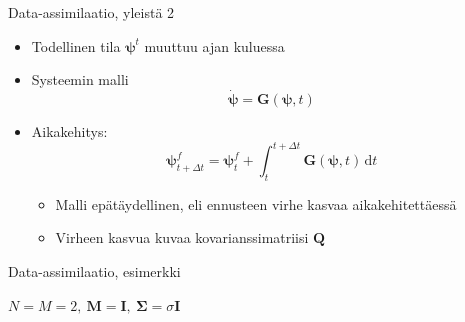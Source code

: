 \documentclass{beamer}
\begin{document}
\begin{frame}{Data-assimilaatio, yleistä 2}

\begin{itemize}
\item Todellinen tila $\boldsymbol{\psi}^t$ muuttuu ajan kuluessa
\item Systeemin malli
\[
\boldsymbol{\dot{\psi}} = \boldsymbol{G}(\boldsymbol{\psi},t)
\]
\item Aikakehitys:
\[
\boldsymbol{\psi}^f_{t+\Delta t} = \boldsymbol{\psi}^f_t + \int_{t}^{t+\Delta t} \! \boldsymbol{G}(\boldsymbol{\psi},t) \, \mathrm{d}t
\]
\begin{itemize}
\item Malli epätäydellinen, eli ennusteen virhe kasvaa aikakehitettäessä
\item Virheen kasvua kuvaa kovarianssimatriisi $\mathbf{Q}$
\end{itemize}
\end{itemize}

\end{frame}

\begin{frame}{Data-assimilaatio, esimerkki}

$N=M=2,~\mathbf{M} = \mathbf{I},~\boldsymbol{\Sigma} = \sigma\mathbf{I}$

\begin{figure}
\end{figure}

\end{frame}
\end{document}
